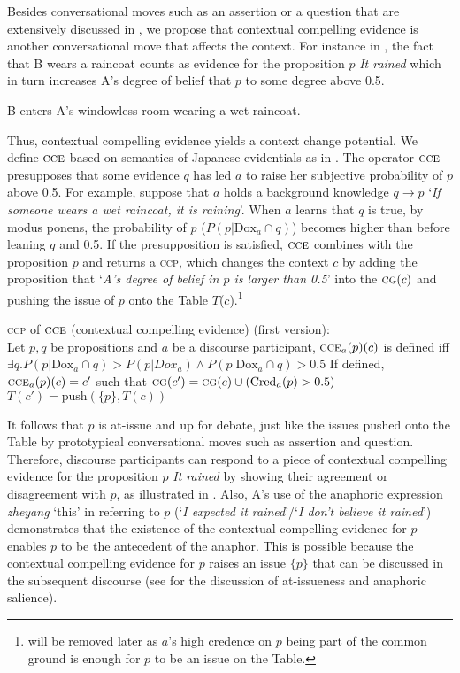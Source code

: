 \documentclass[output=paper,colorlinks,citecolor=brown]{langscibook}
\begin{document}
Besides   conversational moves such as an assertion
or a question that are extensively discussed in \citet{FB}, we propose that  contextual compelling
evidence is another conversational move that affects the context. For instance in , the fact that B wears a raincoat counts as evidence for the proposition $p$ \textit{It rained} which in turn increases A's degree of belief that $p$ to some degree above 0.5.

\ea\label{4.55wr} B enters A's windowless room wearing a  wet raincoat.
\z

Thus,  contextual compelling evidence yields a   context change potential. We define  $\textsc{cce}$ based on  semantics of Japanese evidentials as in . The operator $\textsc{cce}$ presupposes that some evidence $q$ has led $a$ to raise her subjective probability of $p$ above 0.5.  For example, suppose that $a$ holds a background knowledge $q\to p$ `\textit{If someone wears a wet raincoat, it is raining}'.  When $a$ learns that $q$ is true, by modus ponens, the probability of $p$ ($P(p|\mathrm{Dox}_a\cap q)$) becomes higher than before leaning $q$ and 0.5.    If the presupposition is satisfied,  $\textsc{cce}$ combines  with the proposition  $p$ and returns a \textsc{ccp}, which changes the context ${c}$ by adding the proposition that `\textit{A's degree of belief in $p$ is larger than 0.5}' into the $\textsc{cg}({c})$ and pushing the issue of $p$ onto the Table ${T}$(${c}$).\footnote{ will  be removed later as $a$'s high credence on $p$ being part of the common ground is enough for $p$ to be an issue on the Table.}



\ea\label{Efr} \textsc{ccp} of $\textsc{cce}$ (contextual compelling evidence)  (first version):\\
Let $p, q$ be  propositions  and $a$ be a discourse participant,
\ea $\textsc{cce}_a(p)({c})$ is defined iff $\exists q.  P(p|\mathrm{Dox}_a\cap q) > P(p|Dox_a) \land P(p|\mathrm{Dox}_a\cap q)> 0.5$
\ex If defined,
$\textsc{cce}_a(p)({c}) = {c}'$ such that
\ea\label{Ef31} $\textsc{cg}({c}') = \textsc{cg}({c})  \cup (\mathrm{Cred}_a(p) > 0.5)$
\ex\label{Ef32}
 ${T}({c}') = \mathrm{push}(\{p\}, {T}({c}))$
\z
\z
\z

\largerpage
It follows that  $p$ is at-issue and  up for debate, just like the issues pushed onto the Table by prototypical conversational moves such as assertion and question. Therefore, discourse participants can  respond to a piece of contextual compelling evidence for the proposition $p$ \textit{It rained} by showing their agreement or disagreement with $p$, as illustrated in .   Also, A's use of the anaphoric expression \textit{zheyang} `this' in  referring to  $p$ (`\textit{I expected it rained}'/`\textit{I don't believe it rained}') demonstrates that the existence of the contextual compelling evidence for $p$ enables $p$  to be the antecedent of the anaphor. This  is possible because the contextual compelling evidence for $p$  raises an issue $\{p\}$  that can be discussed in the subsequent discourse (see \citealt{Snider2017} for the discussion of  at-issueness and anaphoric salience).
\end{document}
